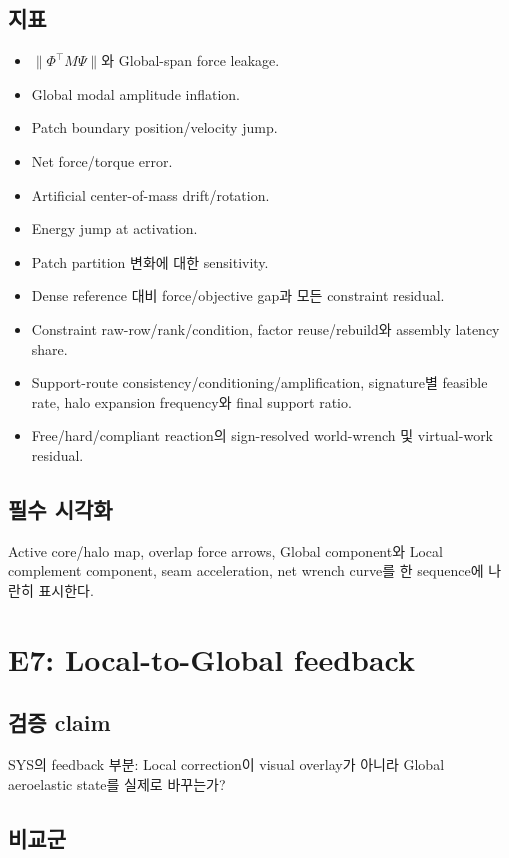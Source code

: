 \documentclass[11pt,a4paper]{article}
\begin{document}
\subsection*{지표}

\begin{itemize}[leftmargin=1.5em]
  \item \(\|\Phi^\top M\Psi\|\)와 Global-span force leakage.
  \item Global modal amplitude inflation.
  \item Patch boundary position/velocity jump.
  \item Net force/torque error.
  \item Artificial center-of-mass drift/rotation.
  \item Energy jump at activation.
  \item Patch partition 변화에 대한 sensitivity.
  \item Dense reference 대비 force/objective gap과 모든 constraint residual.
  \item Constraint raw-row/rank/condition, factor reuse/rebuild와 assembly latency share.
  \item Support-route consistency/conditioning/amplification,
  signature별 feasible rate, halo expansion frequency와 final support ratio.
  \item Free/hard/compliant reaction의 sign-resolved world-wrench 및 virtual-work residual.
\end{itemize}

\subsection*{필수 시각화}

Active core/halo map, overlap force arrows,
Global component와 Local complement component,
seam acceleration, net wrench curve를 한 sequence에 나란히 표시한다.

\section{E7: Local-to-Global feedback}

\subsection*{검증 claim}

SYS의 feedback 부분:
Local correction이 visual overlay가 아니라 Global aeroelastic state를 실제로 바꾸는가?

\subsection*{비교군}
\end{document}
